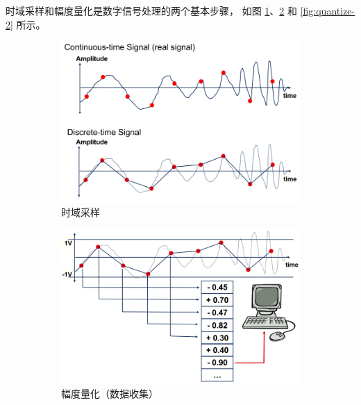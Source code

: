 时域采样和幅度量化是数字信号处理的两个基本步骤，
如图 \ref{fig:sampling}、\ref{fig:quantize-1} 和 \ref{fig:quantize-2} 所示。
\begin{figure}[H]
    \centering
    \begin{subfigure}{0.30\textwidth}
        \centering
        \includegraphics[width=\textwidth]{chap2/img/sampling.png}
        \caption{时域采样}
        \label{fig:sampling}
    \end{subfigure}
    \hfill
    \begin{subfigure}{0.30\textwidth}
        \centering
        \includegraphics[width=\textwidth]{chap2/img/quantize-1.png}
        \caption{幅度量化（数据收集）}
        \label{fig:quantize-1}
    \end{subfigure}
    \hfill
    \begin{subfigure}{0.30\textwidth}
        \centering

\end{subfigure}
\end{figure}
